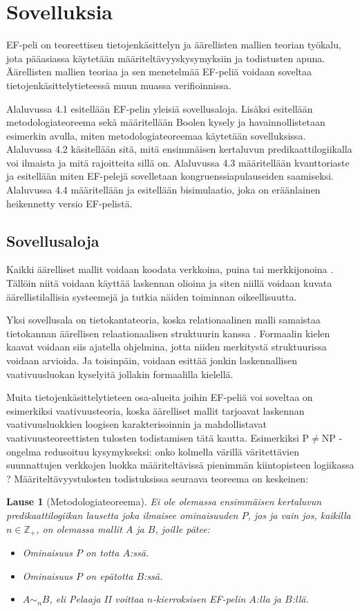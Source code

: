 \documentclass[finnish]{tktltiki2}
\newtheorem{lau}{Lause}
\theoremstyle{definition}
\theoremstyle{remark}
\begin{document}
\section{Sovelluksia}
EF-peli on teoreettisen tietojenkäsittelyn ja äärellisten mallien teorian työkalu, jota pääasiassa käytetään määriteltävyyskysymyksiin ja todistusten apuna. Äärellisten mallien teoriaa ja sen menetelmää EF-peliä voidaan soveltaa tietojenkäsittelytieteessä muun muassa verifioinnissa. 

Alaluvussa 4.1 esitellään EF-pelin yleisiä sovellusaloja. Lisäksi esitellään metodologiateoreema sekä määritellään Boolen kysely ja havainnollistetaan esimerkin avulla, miten metodologiateoreemaa käytetään sovelluksissa. Alaluvussa 4.2 käsitellään sitä, mitä ensimmäisen kertaluvun predikaattilogiikalla voi ilmaista ja mitä rajoitteita sillä on. Alaluvussa 4.3 määritellään kvanttoriaste ja esitellään miten EF-pelejä sovelletaan kongruenssiapulauseiden saamiseksi. Alaluvussa 4.4 määritellään ja esitellään bisimulaatio, joka on eräänlainen heikennetty versio EF-pelistä.

\subsection{Sovellusaloja}
Kaikki äärelliset mallit voidaan koodata verkkoina, puina tai merkkijonoina \cite{Ebb99}. Tällöin niitä voidaan käyttää laskennan olioina ja siten niillä voidaan kuvata äärellistilallisia systeemejä ja tutkia näiden toiminnan oikeellisuutta. 

Yksi sovellusala on tietokantateoria, koska relationaalinen malli samaistaa tietokannan äärellisen relaationaalisen struktuurin kanssa \cite{Luo10}. Formaalin kielen kaavat voidaan siis ajatella ohjelmina, jotta niiden merkitystä struktuurissa voidaan arvioida. Ja toisinpäin, voidaan esittää jonkin laskennallisen vaativuusluokan kyselyitä jollakin formaalilla kielellä.

Muita tietojenkäsittelytieteen osa-alueita joihin EF-peliä voi soveltaa on esimerkiksi vaativuusteoria, koska äärelliset mallit tarjoavat laskennan vaativuusluokkien loogisen karakterisoinnin ja mahdollistavat vaativuusteoreettisten tulosten todistamisen tätä kautta. Esimerkiksi $\mathrm{P} \neq \mathrm{NP}$ -ongelma redusoituu kysymykseksi: onko kolmella värillä väritettävien suunnattujen verkkojen luokka määriteltävissä pienimmän kiintopisteen logiikassa \cite{Imm86}? Määriteltävyystulosten todistuksissa seuraava teoreema on keskeinen:

\begin{lau}[Metodologiateoreema]
Ei ole olemassa ensimmäisen kertaluvun predikaattilogiikan lausetta joka ilmaisee ominaisuuden $P$, jos ja vain jos, kaikilla $n \in \mathbb{Z}_+$, on olemassa mallit $A$ ja $B$, joille pätee:
\begin{itemize}
\item Ominaisuus $P$ on totta $A$:ssä.
\item Ominaisuus $P$ on epätotta $B$:ssä.
\item $A \sim_n B$, eli Pelaaja II voittaa $n$-kierroksisen EF-pelin $A$:lla ja $B$:llä.
\end{itemize}
\end{lau}
\end{document}
